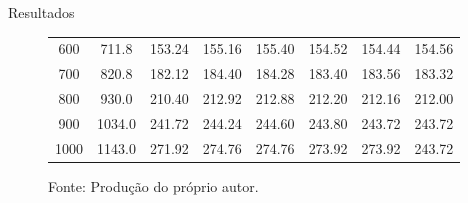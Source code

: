 \documentclass[portrait,a0paper,fontscale=0.285]{baposter} %
\begin{document}
\begin{poster}
\begin{posterbox}[name=resultados,column=1,below=metodologia,span=2]{Resultados}
\begin{figure}[H]
\begin{minipage}[t]{0.48\textwidth}
{\begin{tabular}{|cc|c|c|c|c|c|c|}
600 & 711.8 & 153.24& 155.16& 155.40& 154.52& \cellcolor{blue!20}154.44& 154.56\\
700 & 820.8 & 182.12& 184.40& 184.28& 183.40& 183.56& \cellcolor{blue!20}183.32\\
800 & 930.0 & 210.40& 212.92& 212.88& 212.20& 212.16& \cellcolor{blue!20}212.00\\
900 & 1034.0 & 241.72& 244.24& 244.60& 243.80& \cellcolor{blue!20}243.72& \cellcolor{blue!20}243.72\\
1000 & 1143.0 & 271.92& 274.76& 274.76& \cellcolor{blue!20}273.92& \cellcolor{blue!20}273.92& \cellcolor{blue!20}243.72\\
\hline
\end{tabular}}
\caption*{\scriptsize Fonte: Produção do próprio autor.}
\label{tab:resultados_medios_completos}
\end{minipage}

\end{figure}

\end{posterbox}
\end{poster}
\end{document}

